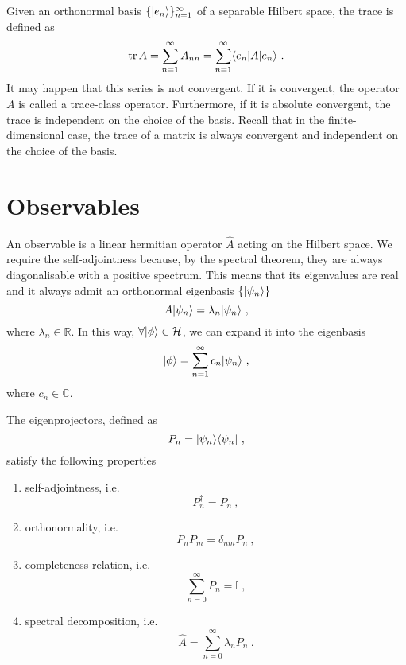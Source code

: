     Given an orthonormal basis $\{\vert e_n\rangle\}_{n=1}^\infty$ of a separable Hilbert space, the trace is defined as 
    \begin{equation*}
        \operatorname{tr} A = \sum_{n=1}^\infty A_{nn} = \sum_{n=1}^\infty \langle e_n\vert A \vert e_n\rangle ~.
    \end{equation*}
    It may happen that this series is not convergent. If it is convergent, the operator $A$ is called a trace-class operator. Furthermore, if it is absolute convergent, the trace is independent on the choice of the basis. Recall that in the finite-dimensional case, the trace of a matrix is always convergent and independent on the choice of the basis.

\section{Observables}

    An observable is a linear hermitian operator $\hat A$ acting on the Hilbert space. We require the self-adjointness because, by the spectral theorem, they are always diagonalisable with a positive spectrum. This means that its eigenvalues are real and it always admit an orthonormal eigenbasis $\{\vert\psi_n\rangle\}$
    \begin{equation}\label{eigen}
        A \vert\psi_n\rangle = \lambda_n \vert\psi_n\rangle ~,
    \end{equation}
    where $\lambda_n \in \mathbb R$. In this way, $\forall \vert\phi\rangle \in \mathcal H$, we can expand it into the eigenbasis 
    \begin{equation}\label{exp}
        \vert\phi\rangle = \sum_{n=1}^{\infty} c_n \vert\psi_n\rangle ~,
    \end{equation}
    where $c_n \in \mathbb C$.

    The eigenprojectors, defined as 
    \begin{equation*}
        P_n = \vert\psi_n\rangle \langle\psi_n\vert ~,
    \end{equation*}
    satisfy the following properties 
    \begin{enumerate}
        \item self-adjointness, i.e.
            \begin{equation*}
                P_n^\dagger = P_n ~,
            \end{equation*}
        \item orthonormality, i.e.
            \begin{equation*}
                P_n P_m = \delta_{nm} P_n ~,
            \end{equation*}
        \item completeness relation, i.e.
            \begin{equation}\label{compl}
                \sum_{n = 0}^{\infty} P_n = \mathbb I~,
            \end{equation}
        \item spectral decomposition, i.e.
            \begin{equation*}
                \hat A = \sum_{n=0}^{\infty} \lambda_n P_n ~.
            \end{equation*}
    \end{enumerate}

